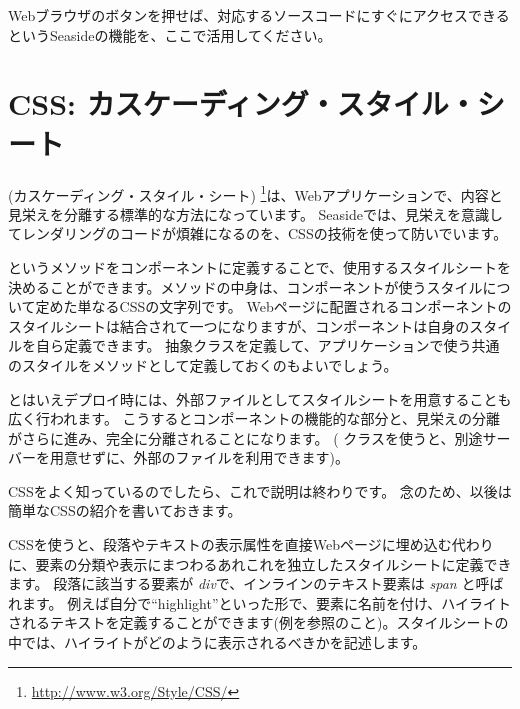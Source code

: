 \documentclass[a4paper,10pt,twoside]{book}
\begin{document}
Webブラウザのボタンを押せば、対応するソースコードにすぐにアクセスできるというSeasideの機能を、ここで活用してください。

\section{CSS: カスケーディング・スタイル・シート}


(カスケーディング・スタイル・シート) \footnote{\url{http://www.w3.org/Style/CSS/}}は、Webアプリケーションで、内容と見栄えを分離する標準的な方法になっています。
Seasideでは、見栄えを意識してレンダリングのコードが煩雑になるのを、CSSの技術を使って防いでいます。

というメソッドをコンポーネントに定義することで、使用するスタイルシートを決めることができます。メソッドの中身は、コンポーネントが使うスタイルについて定めた単なるCSSの文字列です。
Webページに配置されるコンポーネントのスタイルシートは結合されて一つになりますが、コンポーネントは自身のスタイルを自ら定義できます。
抽象クラスを定義して、アプリケーションで使う共通のスタイルをメソッドとして定義しておくのもよいでしょう。

とはいえデプロイ時には、外部ファイルとしてスタイルシートを用意することも広く行われます。
こうするとコンポーネントの機能的な部分と、見栄えの分離がさらに進み、完全に分離されることになります。
( クラスを使うと、別途サーバーを用意せずに、外部のファイルを利用できます)。

CSSをよく知っているのでしたら、これで説明は終わりです。
念のため、以後は簡単なCSSの紹介を書いておきます。

CSSを使うと、段落やテキストの表示属性を直接Webページに埋め込む代わりに、要素の分類や表示にまつわるあれこれを独立したスタイルシートに定義できます。
段落に該当する要素が \emph{div}で、インラインのテキスト要素は \emph{span} と呼ばれます。
例えば自分で``highlight''といった形で、要素に名前を付け、ハイライトされるテキストを定義することができます(例を参照のこと)。スタイルシートの中では、ハイライトがどのように表示されるべきかを記述します。
\end{document}
